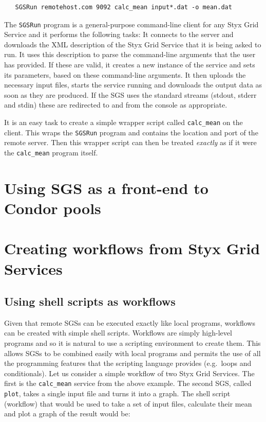 \documentclass[a4paper]{article}
\begin{document}
\begin{verbatim}
   SGSRun remotehost.com 9092 calc_mean input*.dat -o mean.dat
\end{verbatim}

The \texttt{SGSRun} program is a general-purpose command-line client for any Styx Grid Service and it performs the following tasks:  It connects to the server and downloads the XML description of the Styx Grid Service that it is being asked to run.  It uses this description to parse the command-line arguments that the user has provided.  If these are valid, it creates a new instance of the service and sets its parameters, based on these command-line arguments.  It then uploads the necessary input files, starts the service running and downloads the output data as soon as they are produced.  If the SGS uses the standard streams (stdout, stderr and stdin) these are redirected to and from the console as appropriate.

It is an easy task to create a simple wrapper script called \texttt{calc\_mean} on the client.  This wraps the \texttt{SGSRun} program and contains the location and port of the remote server.  Then this wrapper script can then be treated \textit{exactly\/} as if it were the \texttt{calc\_mean} program itself.

\section{Using SGS as a front-end to Condor pools}


\section{Creating workflows from Styx Grid Services}

\subsection{Using shell scripts as workflows}\label{sec:shellscripts}
Given that remote SGSs can be executed exactly like local programs, workflows can be created with simple shell scripts.  Workflows are simply high-level programs and so it is natural to use a scripting environment to create them.  This allows SGSs to be combined easily with local programs and permits the use of all the programming features that the scripting language provides (e.g.\ loops and conditionals).  Let us consider a simple workflow of two Styx Grid Services.  The first is the \texttt{calc\_mean} service from the above example.  The second SGS, called \texttt{plot}, takes a single input file and turns it into a graph.  The shell script (workflow) that would be used to take a set of input files, calculate their mean and plot a graph of the result would be:
\end{document}
